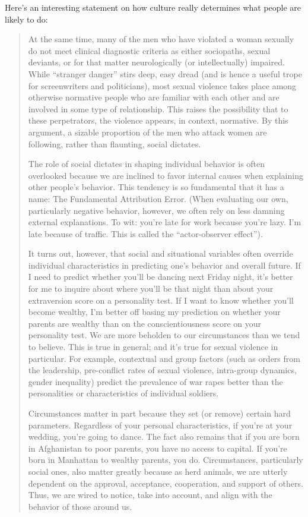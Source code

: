 \documentclass[11pt]{article}
\begin{document}
Here’s an interesting statement on how culture really determines what people are likely to do:
\begin{quote}
At the same time, many of the men who have violated a woman sexually do not meet clinical diagnostic criteria as either sociopaths, sexual deviants, or for that matter neurologically (or intellectually) impaired. While “stranger danger” stirs deep, easy dread (and is hence a useful trope for screenwriters and politicians), most sexual violence takes place among otherwise normative people who are familiar with each other and are involved in some type of relationship. This raises the possibility that to these perpetrators, the violence appears, in context, normative. By this argument, a sizable proportion of the men who attack women are following, rather than flaunting, social dictates.

The role of social dictates in shaping individual behavior is often overlooked because we are inclined to favor internal causes when explaining other people’s behavior. This tendency is so fundamental that it has a name: The Fundamental Attribution Error. (When evaluating our own, particularly negative behavior, however, we often rely on less damning external explanations. To wit: you’re late for work because you’re lazy. I’m late because of traffic. This is called the “actor-observer effect”).

It turns out, however, that social and situational variables often override individual characteristics in predicting one’s behavior and overall future. If I need to predict whether you’ll be dancing next Friday night, it’s better for me to inquire about where you’ll be that night than about your extraversion score on a personality test. If I want to know whether you’ll become wealthy, I’m better off basing my prediction on whether your parents are wealthy than on the conscientiousness score on your personality test. We are more beholden to our circumstances than we tend to believe. This is true in general; and it’s true for sexual violence in particular. For example, contextual and group factors (such as orders from the leadership, pre-conflict rates of sexual violence, intra-group dynamics, gender inequality) predict the prevalence of war rapes better than the personalities or characteristics of individual soldiers.

Circumstances matter in part because they set (or remove) certain hard parameters. Regardless of your personal characteristics, if you’re at your wedding, you’re going to dance. The fact also remains that if you are born in Afghanistan to poor parents, you have no access to capital. If you’re born in Manhattan to wealthy parents, you do. Circumstances, particularly social ones, also matter greatly because as herd animals, we are utterly dependent on the approval, acceptance, cooperation, and support of others. Thus, we are wired to notice, take into account, and align with the behavior of those around us.


\end{quote}
\end{document}
